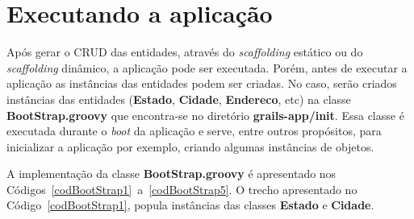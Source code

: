




\section{Executando a aplicação}

\vspace{0.5cm}

Após gerar  o CRUD das  entidades, através do  {\it scaffolding} estático  ou do
{\it  scaffolding} dinâmico,  a aplicação  pode ser  executada. Porém,  antes de
executar a  aplicação as  instâncias das entidades  podem ser criadas.  No caso,
serão  criados  instâncias  das  entidades  ({\bf Estado},  {\bf  Cidade},  {\bf
  Endereco}, etc) na classe  {\bf BootStrap.groovy} que encontra-se no diretório
{\bf grails-app/init}. Essa classe é executada durante o {\it boot} da aplicação
e  serve, entre  outros propósitos,  para inicializar  a aplicação  por exemplo,
criando algumas instâncias de objetos.

\vspace{0.2cm}

A   implementação   da  classe   {\bf   BootStrap.groovy}   é  apresentado   nos
Códigos~\ref{codBootStrap1}~a~\ref{codBootStrap5}.   O   trecho  apresentado  no
Código~\ref{codBootStrap1}, popula  instâncias das  classes {\bf Estado}  e {\bf
  Cidade}.

